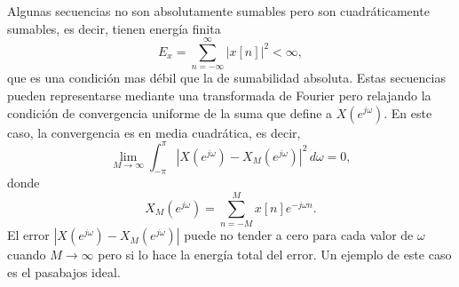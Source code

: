 \documentclass[a4paper]{report}
\begin{document}
Algunas secuencias no son absolutamente sumables pero son cuadráticamente sumables, es decir, tienen energía finita
\[
 E_x=\sum_{n=-\infty}^\infty |x[n]|^2<\infty,
\]
que es una condición mas débil que la de sumabilidad absoluta. Estas secuencias pueden representarse mediante una transformada de Fourier pero relajando la condición de convergencia uniforme de la suma que define a \(X(e^{j\omega})\). En este caso, la convergencia es en media cuadrática, es decir,
\[
 \lim_{M\to\infty}\int_{-\pi}^\pi|X(e^{j\omega})-X_M(e^{j\omega})|^2\,d\omega=0,
\]
donde 
\[
 X_M(e^{j\omega})=\sum_{n=-M}^Mx[n]e^{-j\omega n}.
\]
El error \(|X(e^{j\omega})-X_M(e^{j\omega})|\) puede no tender a cero para cada valor de \(\omega\) cuando \(M\to\infty\) pero si lo hace la energía total del error. Un ejemplo de este caso es el pasabajos ideal.
 
\end{document}
